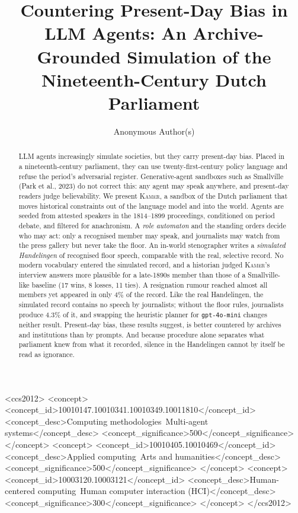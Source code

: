 \documentclass[sigconf,review,anonymous]{acmart}
\newcommand{\sys}{\textsc{Kamer}}
\begin{document}
\title[Countering Present-Day Bias in LLM Agents]{Countering Present-Day
Bias in LLM Agents: An Archive-Grounded Simulation of the Nineteenth-Century
Dutch Parliament}

\author{Anonymous Author(s)}

\renewcommand{\shortauthors}{Anonymous et al.}

\begin{abstract}
LLM agents increasingly simulate societies, but they carry present-day
bias. Placed in a nineteenth-century parliament, they can use
twenty-first-century policy language and refuse the period's adversarial
register. Generative-agent sandboxes such as Smallville (Park
et al., 2023) do not correct this: any agent may speak anywhere, and present-day
readers judge believability. We present \sys{}, a
sandbox of the Dutch parliament that moves historical constraints out of
the language model and into the world. Agents are seeded from attested
speakers in the 1814--1899 proceedings, conditioned on period debate, and
filtered for anachronism. A \emph{role automaton} and the standing orders
decide who may act: only a recognised member may speak, and journalists
may watch from the press gallery but never take the floor. An in-world
stenographer writes a \emph{simulated Handelingen} of recognised floor
speech, comparable with the real, selective record. No
modern vocabulary entered the simulated record, and a historian judged
\sys{}'s interview answers more plausible for a late-1890s member than
those of a Smallville-like baseline (17 wins, 8 losses, 11 ties). A
resignation rumour reached almost all members yet appeared in only $4\%$
of the record. Like the real Handelingen, the simulated record contains no
speech by journalists; without the floor rules, journalists produce
$4.3\%$ of it, and swapping the heuristic planner for \texttt{gpt-4o-mini}
changes neither result. Present-day bias, these results suggest, is
better countered by archives and institutions than by prompts.
And because procedure alone separates what parliament knew from what it
recorded, silence in the Handelingen cannot by itself be read as
ignorance.
\end{abstract}

\begin{CCSXML}
<ccs2012>
<concept>
<concept_id>10010147.10010341.10010349.10011810</concept_id>
<concept_desc>Computing methodologies~Multi-agent systems</concept_desc>
<concept_significance>500</concept_significance>
</concept>
<concept>
<concept_id>10010405.10010469</concept_id>
<concept_desc>Applied computing~Arts and humanities</concept_desc>
<concept_significance>500</concept_significance>
</concept>
<concept>
<concept_id>10003120.10003121</concept_id>
<concept_desc>Human-centered computing~Human computer interaction (HCI)</concept_desc>
<concept_significance>300</concept_significance>
</concept>
</ccs2012>
\end{CCSXML}
\end{document}
